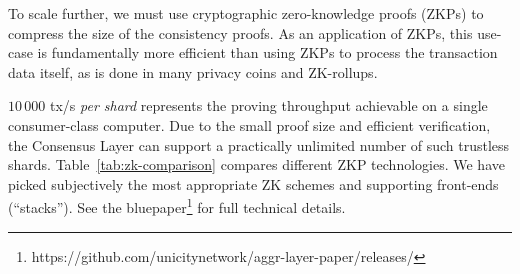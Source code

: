 \documentclass{article}
\begin{document}
To scale further, we must use cryptographic zero-knowledge proofs (ZKPs) to compress the size of the consistency proofs. As an application of ZKPs, this use-case is fundamentally more efficient than using ZKPs to process the transaction data itself, as is done in many privacy coins and ZK-rollups.

$10\,000$ tx/s \emph{per shard} represents the proving throughput achievable on a single consumer-class computer. Due to the small proof size and efficient verification, the Consensus Layer can support a practically unlimited number of such trustless shards. Table~\ref{tab:zk-comparison} compares different ZKP technologies. We have picked subjectively the most appropriate ZK schemes and supporting front-ends (``stacks''). See the bluepaper\footnote{https://github.com/unicitynetwork/aggr-layer-paper/releases/} for full technical details.
\end{document}
